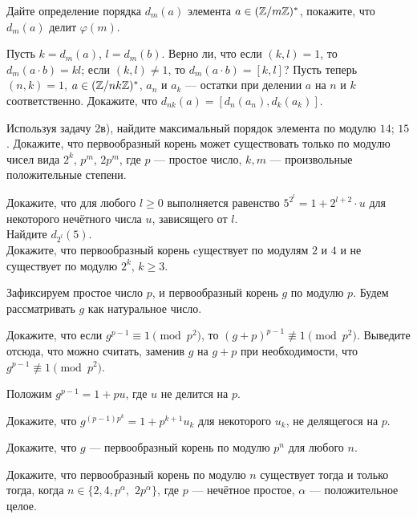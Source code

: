 \documentclass[a4paper,12pt]{article}
\begin{document}
 Дайте определение порядка $d_m(a)$ элемента $a \in (\mathbb{Z}/m\mathbb{Z})^*$, покажите, что $d_m(a)$ делит $\varphi(m)$.

 Пусть $k = d_m(a)$, $l = d_m(b)$. Верно ли, что 
 если $(k,l)=1$, то $d_m(a\cdot b)=kl$;
 если $(k,l)\neq 1$, то $d_m(a \cdot b) =[k,l]$?
Пусть теперь $(n,k)=1$, $a \in (\mathbb{Z}/nk\mathbb{Z})^*$, $a_n$ и $a_k$ ---
остатки при делении $a$ на $n$ и $k$ соответственно. Докажите, что $d_{nk}(a) = [d_n(a_n),d_k(a_k)]$.

  Используя задачу 2в), найдите максимальный порядок элемента по модулю $14$; $15$.
 Докажите, что первообразный корень может существовать только по модулю чисел вида $2^k$, $p^m$, $2p^m$, где $p$ --- простое число, $k,m$ --- произвольные положительные степени.

  Докажите, что для любого $l \geq 0$ выполняется равенство $5^{2^l} = 1+2^{l+2}\cdot u$ для некоторого нечётного числа $u$, зависящего от $l$.\\
 Найдите $d_{2^l}(5)$.\\
 Докажите, что первообразный корень cуществует по модулям $2$ и $4$ и не существует по модулю $2^k$, $k \geq 3$.

 Зафиксируем простое число $p$, и первообразный корень $g$ по модулю $p$. Будем рассматривать $g$ как натуральное число.

 Докажите, что если $g^{p-1} \equiv 1 \pmod{p^2}$, то $(g+p)^{p-1} \not \equiv 1 \pmod{p^2}$. Выведите отсюда, что можно считать, заменив $g$ на $g+p$ при необходимости, что $g^{p-1} \not \equiv 1 \pmod{p^2}$.

Положим $g^{p-1}=1+pu$, где $u$ не делится на $p$.

 Докажите, что $g^{(p-1)p^k} = 1+p^{k+1}u_k$ для некоторого $u_k$, не делящегося на $p$.

 Докажите, что $g$ --- первообразный корень по модулю $p^n$ для любого $n$.


 Докажите, что первообразный корень по модулю $n$ существует тогда и только тогда, когда $n \in \{2, 4,
p^{\alpha},$ $ 2p^{\alpha}\}$, где $p$ --- нечётное простое, $\alpha
$  --- положительное целое.

	
\end{document}
